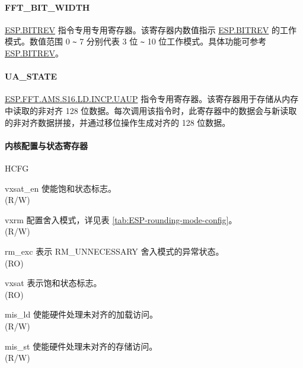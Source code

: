 \documentclass[main\_\_CN.tex]{subfiles}
\begin{document}
\paragraph{FFT\_BIT\_WIDTH}

\hyperref[instruction:ESPBITREV]{ESP.BITREV} 指令专用专用寄存器。该寄存器内数值指示 \hyperref[instruction:ESPBITREV]{ESP.BITREV} 的工作模式。数值范围 0 \verb+~+ 7 分别代表 3 位 \verb+~+ 10 位工作模式。具体功能可参考 \hyperref[instruction:ESPBITREV]{ESP.BITREV}。

\paragraph{UA\_STATE}

\hyperref[instruction:ESPFFTAMSS16LDINCPUAUP]{ESP.FFT.AMS.S16.LD.INCP.UAUP} 指令专用寄存器。该寄存器用于存储从内存中读取的非对齐 128 位数据。每次调用该指令时，此寄存器中的数据会与新读取的非对齐数据拼接，并通过移位操作生成对齐的 128 位数据。

\paragraph{内核配置与状态寄存器}

\begin{register}{H}{CFG}{}\label{regdesc:ESPCFG}
%
%
%
%
%
%
%
\regnewline%
\begin{regdesc}\begin{reglist}
\label{vxsat_en}\item [vxsat\_en] 使能饱和状态标志。\\
(R/W)
\label{vxrm}\item [vxrm] 配置舍入模式，详见表 \ref{tab:ESP-rounding-mode-config}。\\
(R/W)
\label{rm_exc}\item [rm\_exc] 表示 RM\_UNNECESSARY 舍入模式的异常状态。\\
(RO)
\label{vxsat}\item [vxsat] 表示饱和状态标志。\\
(RO)
\label{mis_ld}\item [mis\_ld] 使能硬件处理未对齐的加载访问。\\
(R/W)
\label{mis_st}\item [mis\_st] 使能硬件处理未对齐的存储访问。\\ (R/W)
\end{reglist}\end{regdesc}
\end{register}
\end{document}
